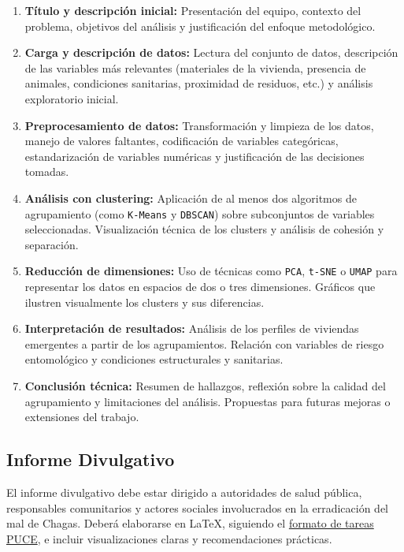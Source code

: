 \documentclass[a4,11pt]{aleph-notas}
\begin{document}
\begin{enumerate}[leftmargin=*, label={\textbf{\arabic*.}}]
\item \textbf{Título y descripción inicial:} Presentación del equipo, contexto del problema, objetivos del análisis y justificación del enfoque metodológico.

\item \textbf{Carga y descripción de datos:} Lectura del conjunto de datos, descripción de las variables más relevantes (materiales de la vivienda, presencia de animales, condiciones sanitarias, proximidad de residuos, etc.) y análisis exploratorio inicial.

\item \textbf{Preprocesamiento de datos:} Transformación y limpieza de los datos, manejo de valores faltantes, codificación de variables categóricas, estandarización de variables numéricas y justificación de las decisiones tomadas.

\item \textbf{Análisis con clustering:} Aplicación de al menos dos algoritmos de agrupamiento (como \texttt{K-Means} y \texttt{DBSCAN}) sobre subconjuntos de variables seleccionadas. Visualización técnica de los clusters y análisis de cohesión y separación.

\item \textbf{Reducción de dimensiones:} Uso de técnicas como \texttt{PCA}, \texttt{t-SNE} o \texttt{UMAP} para representar los datos en espacios de dos o tres dimensiones. Gráficos que ilustren visualmente los clusters y sus diferencias.

\item \textbf{Interpretación de resultados:} Análisis de los perfiles de viviendas emergentes a partir de los agrupamientos. Relación con variables de riesgo entomológico y condiciones estructurales y sanitarias.

\item \textbf{Conclusión técnica:} Resumen de hallazgos, reflexión sobre la calidad del agrupamiento y limitaciones del análisis. Propuestas para futuras mejoras o extensiones del trabajo.
\end{enumerate}

\subsection{Informe Divulgativo}  
El informe divulgativo debe estar dirigido a autoridades de salud pública, responsables comunitarios y actores sociales involucrados en la erradicación del mal de Chagas. Deberá elaborarse en \LaTeX{}, siguiendo el \href{https://www.overleaf.com/latex/templates/formato-tareas-puce/nkgwqjtcrvms}{formato de tareas PUCE}, e incluir visualizaciones claras y recomendaciones prácticas.
\end{document}
